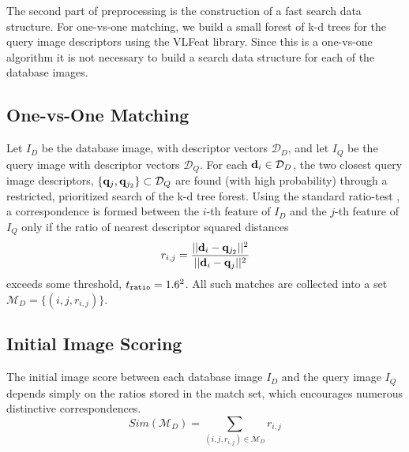 The second part of preprocessing is the construction of a fast search data
structure.  For one-vs-one matching, we build a small forest of k-d
trees \cite{cvpr08HartleyKDTree} for the query image descriptors
using the VLFeat \cite{picm10VedaldiVLFEAT} library.  Since this is a one-vs-one
algorithm it is not necessary to build a search data structure for
each of the database images.

\subsection{One-vs-One Matching} \label{sec:matching1}

Let $I_D$ be the database image, with descriptor vectors
$\mathcal{D}_D$, and let $I_Q$ be the query image with descriptor
vectors $\mathcal{D}_Q$.  For each $\mathbf{d}_i \in \mathcal{D}_D$, the
two closest query image descriptors, $\{\mathbf{q}_{j},
\mathbf{q}_{j_2}\} \subset \mathcal{D}_Q$ are found (with high
probability) through a restricted, prioritized search of the k-d tree
forest.  Using the standard ratio-test \cite{ijcv04LoweSIFT}, a correspondence
is formed between the $i$-th feature of $I_D$ and the $j$-th feature
of $I_Q$ only if the ratio of nearest descriptor squared distances
 \begin{equation} \label{eqn:ratio}
 r_{i,j} = \frac{||\mathbf{d}_i - \mathbf{q}_{j_2}||^2}{||\mathbf{d}_i -  \mathbf{q}_{j}||^2}
 \end{equation}
exceeds some threshold, $t_{\tt ratio} = 1.6^2$.  All such
matches are collected into a set $\mathcal{M}_D = \{ (i, j, r_{i,j}) \}$.

\subsection{Initial Image Scoring} \label{sec:iis}

The initial image score between each database image $I_D$ and the
query image $I_Q$ depends simply on
the ratios stored in the match set, which encourages numerous distinctive correspondences.
\begin{equation} \label{eqn:sim}
 Sim(\mathcal{M}_D) = \sum_{(i, j, r_{i,j}) \in \mathcal{M}_D} r_{i,j}
\end{equation}


